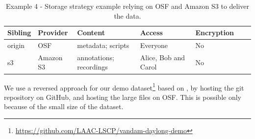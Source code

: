 \documentclass[smallextended]{svjour3}       %
\begin{document}
\begin{table}[!htbp]
\centering
\begin{tabular}{@{}lllllll@{}}
\toprule
\textbf{Sibling} & \textbf{Provider} & \textbf{Content} & \textbf{Access} & \textbf{Encryption} \\ \midrule
origin   & OSF     & metadata; scripts & Everyone & No  \\
s3 & Amazon S3  & annotations; recordings & Alice, Bob and Carol  & No \\ \bottomrule
\end{tabular}
\caption{\label{table:storage4}Example 4 - Storage strategy example relying on OSF and Amazon S3 to deliver the data.}
\end{table}

We use a reversed approach for our demo dataset\footnote{\url{https://github.com/LAAC-LSCP/vandam-daylong-demo}} based on  \citep{vandam-day}, by hosting the git repository on GitHub, and hosting the large files on OSF. This is possible only because of the small size of the dataset.



\end{document}
